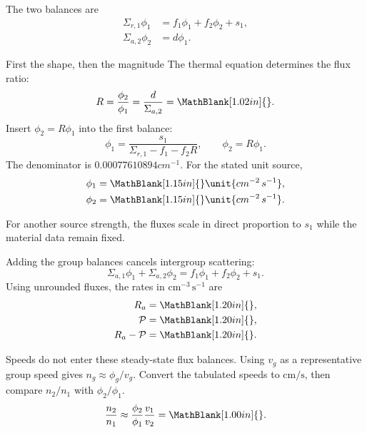 \begin{handoutcolumns}
\switchcolumn
\RaggedRight
{}
The two balances are
\begin{align*}
 \Sigma_{r,1}\phi_1&=f_1\phi_1+f_2\phi_2+s_1,\\
 \Sigma_{a,2}\phi_2&=d\phi_1.
\end{align*}
\begin{boardbox}{First the shape, then the magnitude}
The thermal equation determines the flux ratio:
\[
 R=\frac{\phi_2}{\phi_1}=\frac{d}{\Sigma_{a,2}}
 =\MathBlank[1.02in]{}.
\]
Insert $\phi_2=R\phi_1$ into the first balance:
\[
 \boxed{\phi_1=\frac{s_1}{\Sigma_{r,1}-f_1-f_2R}},
 \qquad \boxed{\phi_2=R\phi_1}.
\]
The denominator is $0.00077610894\unit{cm^{-1}}$.
For the stated unit source,
\begin{align*}
 \phi_1&=\MathBlank[1.15in]{}\unit{cm^{-2}\,s^{-1}},\\
 \phi_2&=\MathBlank[1.15in]{}\unit{cm^{-2}\,s^{-1}}.
\end{align*}
\end{boardbox}
For another source strength, the fluxes scale in direct proportion
to $s_1$ while the material data remain fixed.

Adding the group balances cancels intergroup scattering:
\[
 \boxed{\Sigma_{a,1}\phi_1+\Sigma_{a,2}\phi_2
       =f_1\phi_1+f_2\phi_2+s_1}.
\]
Using unrounded fluxes, the rates in $\mathrm{cm^{-3}\,s^{-1}}$ are
\begin{align*}
 R_a&=\MathBlank[1.20in]{},\\
 \mathcal P&=\MathBlank[1.20in]{},\\
 R_a-\mathcal P&=\MathBlank[1.20in]{}.
\end{align*}
\begin{checkpoint}
Speeds do not enter these steady-state flux balances. Using
$v_g$ as a representative group speed gives
$n_g\approx\phi_g/v_g$. Convert the tabulated speeds to
$\mathrm{cm/s}$, then compare $n_2/n_1$ with $\phi_2/\phi_1$.
\[
 \frac{n_2}{n_1}\approx
 \frac{\phi_2}{\phi_1}\frac{v_1}{v_2}
 =\MathBlank[1.00in]{}.
\]
\end{checkpoint}
\end{handoutcolumns}

